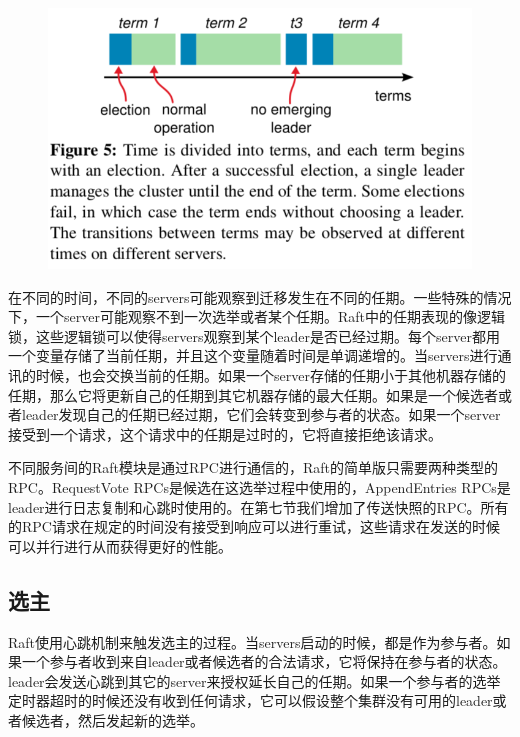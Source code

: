 \documentclass[journal]{IEEEtran}
\begin{document}
\begin{figure}[htbp]
\begin{center}
\includegraphics[width=1\linewidth]{./fig5.png}
\end{center}
\end{figure}

在不同的时间，不同的servers可能观察到迁移发生在不同的任期。一些特殊的情况下，一个server可能观察不到一次选举或者某个任期。Raft中的任期表现的像逻辑锁，这些逻辑锁可以使得servers观察到某个leader是否已经过期。每个server都用一个变量存储了当前任期，并且这个变量随着时间是单调递增的。当servers进行通讯的时候，也会交换当前的任期。如果一个server存储的任期小于其他机器存储的任期，那么它将更新自己的任期到其它机器存储的最大任期。如果是一个候选者或者leader发现自己的任期已经过期，它们会转变到参与者的状态。如果一个server接受到一个请求，这个请求中的任期是过时的，它将直接拒绝该请求。

不同服务间的Raft模块是通过RPC进行通信的，Raft的简单版只需要两种类型的RPC。RequestVote RPCs是候选在这选举过程中使用的，AppendEntries RPCs是leader进行日志复制和心跳时使用的。在第七节我们增加了传送快照的RPC。所有的RPC请求在规定的时间没有接受到响应可以进行重试，这些请求在发送的时候可以并行进行从而获得更好的性能。

\subsection{选主}
Raft使用心跳机制来触发选主的过程。当servers启动的时候，都是作为参与者。如果一个参与者收到来自leader或者候选者的合法请求，它将保持在参与者的状态。leader会发送心跳到其它的server来授权延长自己的任期。如果一个参与者的选举定时器超时的时候还没有收到任何请求，它可以假设整个集群没有可用的leader或者候选者，然后发起新的选举。
\end{document}
